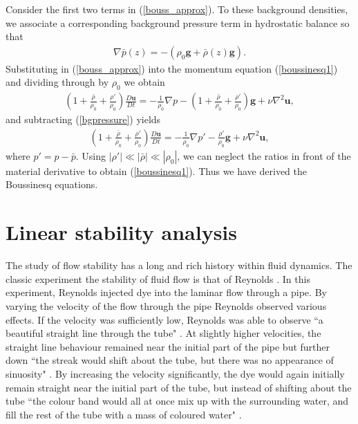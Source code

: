Consider the first two terms in (\ref{bouss_approx}). To these background densities, we associate \cite{kundu,vallis} a corresponding background pressure term in hydrostatic balance so that
\begin{align}
\nabla \bar{p}(z) = -(\rho_{0}\textbf{g} + \bar{\rho}(z)\textbf{g}).\label{bgpressure}
\end{align} 
Substituting in (\ref{bouss_approx}) into the momentum equation (\ref{boussinesq1}) and dividing through by $\rho_{0}$ we obtain
\begin{align} 
\left(1 + \frac{\bar{\rho}}{\rho_{0}} + \frac{\rho'}{\rho_{0}}\right)\frac{D\bm{u}}{Dt} = -\frac{1}{\rho_{0}}\nabla p - \left(1 + \frac{\bar{\rho}}{\rho_{0}} + \frac{\rho'}{\rho_{0}}\right)\textbf{g} + \nu \nabla^{2}\bm{u},
\end{align}
and subtracting (\ref{bgpressure}) yields
\begin{align} 
\left(1 + \frac{\bar{\rho}}{\rho_{0}} + \frac{\rho'}{\rho_{0}}\right)\frac{D\bm{u}}{Dt} = -\frac{1}{\rho_{0}}\nabla p' - \frac{\rho'}{\rho_{0}}\textbf{g} + \nu \nabla^{2}\bm{u},
\end{align}
where $p' = p - \bar{p}$. Using $|\rho'|\ll |\bar{\rho}|\ll|\rho_{0}|$, we can neglect the ratios in front of the material derivative to obtain \cite{kundu} (\ref{boussinesq1}). Thus we have derived the Boussinesq equations.

\section{Linear stability analysis}
The study of flow stability has a long and rich history within fluid dynamics. The classic experiment  the stability of fluid flow is that of  Reynolds \cite{reynolds1883}. In this experiment, Reynolds injected dye into the laminar flow through a pipe. By varying the velocity of the flow through the pipe Reynolds observed various effects. If the velocity was sufficiently low, Reynolds was able to observe ``a beautiful straight line through the tube" \cite{reynolds1883}. At slightly higher velocities, the straight line behaviour remained near the initial part of the pipe but further down ``the streak would shift about the tube, but there was no appearance of sinuosity" \cite{reynolds1883}. By increasing the velocity significantly, the dye would again initially remain straight near the initial part of the tube, but instead of shifting about the tube ``the colour band would all at once mix up with the surrounding water, and fill the rest of the tube with a mass of coloured water" \cite{reynolds1883}.


